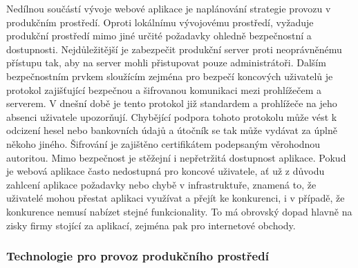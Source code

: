 	Nedílnou součástí vývoje webové aplikace je naplánování strategie provozu v produkčním prostředí.
	Oproti lokálnímu vývojovému prostředí, vyžaduje produkční prostředí mimo jiné určité požadavky ohledně
	bezpečnostní a dostupnosti.
	Nejdůležitější je zabezpečit produkční server proti neoprávněnému přístupu tak, aby na server mohli přistupovat pouze
	administrátoři.
	Dalším bezpečnostním prvkem sloužícím zejména pro bezpečí koncových uživatelů je  protokol zajišťující bezpečnou
	a šifrovanou komunikaci mezi prohlížečem a serverem.
	V dnešní době je tento protokol již standardem a prohlížeče na jeho absenci uživatele upozorňují.
	Chybějící podpora tohoto protokolu může vést k odcizení hesel nebo bankovních údajů a útočník se tak
	může vydávat za úplně někoho jiného.
	Šifrování je zajištěno certifikátem  podepsaným věrohodnou autoritou.
	Mimo bezpečnost je stěžejní i nepřetržitá dostupnost aplikace.
	Pokud je webová aplikace často nedostupná pro koncové uživatele, ať už z důvodu zahlcení aplikace požadavky nebo
	chybě v infrastruktuře, znamená to, že uživatelé mohou přestat aplikaci využívat a přejít
	ke konkurenci, i v případě, že konkurence nemusí nabízet stejné funkcionality.
	To má obrovský dopad hlavně na zisky firmy stojící za aplikací, zejména pak pro internetové obchody.

		\subsubsection{Technologie pro provoz produkčního prostředí}

